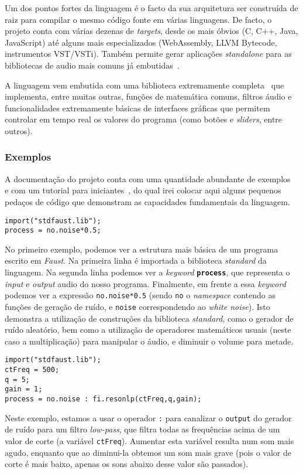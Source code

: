 Um dos pontos fortes da linguagem é o facto da sua arquitetura ser construída de raiz para compilar o mesmo código fonte em várias linguagens. De facto, o projeto conta com várias dezenas de \textit{targets}, desde os mais óbvios (C, C++, Java, JavaScript) até alguns mais especializados (WebAssembly, LLVM Bytecode, instrumentos VST/VSTi). Também permite gerar aplicações \textit{standalone} para as bibliotecas de audio mais comuns já embutidas~\citep{faust-targets}.

A linguagem vem embutida com uma biblioteca extremamente completa~\citep{faust-libraries} que implementa, entre muitas outras, funções de matemática comuns, filtros áudio e funcionalidades extremamente básicas de interfaces gráficas que permitem controlar em tempo real os valores do programa (como botões e \textit{sliders}, entre outros).
	
\subsubsection{Exemplos}
A documentação do projeto conta com uma quantidade abundante de exemplos~\citep{faust-examples} e com um tutorial para iniciantes~\citep{faust-quickstart}, do qual irei colocar aqui alguns pequenos pedaços de código que demonstram as capacidades fundamentais da linguagem.

\begin{lstlisting}[caption={Geração de ruído aleatório com volume a metade},captionpos=b]
import("stdfaust.lib");
process = no.noise*0.5;
\end{lstlisting}

No primeiro exemplo, podemos ver a estrutura mais básica de um programa escrito em \textit{Faust}. Na primeira linha é importada a biblioteca \textit{standard} da linguagem. Na segunda linha podemos ver a \textit{keyword} \textbf{\texttt{process}}, que representa o \textit{input} e \textit{output} audio do nosso programa. Finalmente, em frente a essa \textit{keyword} podemos ver a expressão \texttt{no.noise*0.5} (sendo \texttt{no} o \textit{namespace} contendo as funções de geração de ruído, e \texttt{noise} correspondendo ao \textit{white noise}). Isto demonstra a utilização de construções da biblioteca \textit{standard}, como o gerador de ruído aleatório, bem como a utilização de operadores matemáticos usuais (neste caso a multiplicação) para manipular o áudio, e diminuir o volume para metade.

\begin{lstlisting}[caption={Geração de ruído aleatório com um filtro \textit{low-pass}}]
import("stdfaust.lib");
ctFreq = 500;
q = 5;
gain = 1;
process = no.noise : fi.resonlp(ctFreq,q,gain);
\end{lstlisting}
Neste exemplo, estamos a usar o operador \texttt{:} para canalizar o \texttt{output} do gerador de ruído para um filtro \textit{low-pass}, que filtra todas as frequências acima de um valor de corte (a variável \texttt{ctFreq}). Aumentar esta variável resulta num som mais agudo, enquanto que ao diminui-la obtemos um som mais grave (pois o valor de corte é mais baixo, apenas os sons abaixo desse valor são passados).


